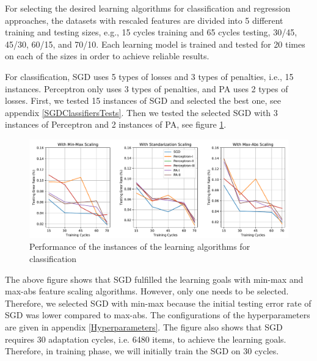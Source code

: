 \documentclass[a4paper,12pt]{article}
\begin{document}
For selecting the desired learning algorithms for classification and regression approaches, the datasets with rescaled features are divided into 5 different training and testing sizes, e.g., 15 cycles training and 65 cycles testing, 30/45, 45/30, 60/15, and 70/10. Each learning model is trained and tested for 20 times on each of the sizes in order to achieve reliable results. 

For classification, SGD uses 5 types of losses and 3 types of penalties, i.e., 15 instances. Perceptron only uses 3 types of penalties, and PA uses 2 types of losses. First, we tested 15 instances of SGD and selected the best one, see appendix \ref{SGDClassifiersTests}. Then we tested the selected SGD with 3 instances of Perceptron and 2 instances of PA, see figure \ref{Classifiers}.
\begin{figure}[H]
    \centering
    \includegraphics[keepaspectratio, width=\linewidth]{graphs/ClassificationModelSelection.pdf}
    \caption{Performance of the instances of the learning algorithms for classification}
    \label{Classifiers}
\end{figure}
The above figure shows that SGD fulfilled the learning goals with min-max and max-abs feature scaling algorithms. However, only one needs to be selected. Therefore, we selected SGD with min-max because the initial testing error rate of SGD was lower compared to max-abs. The configurations of the hyperparameters are given in appendix \ref{Hyperparameters}. The figure also shows that SGD requires 30 adaptation cycles, i.e. 6480 items, to achieve the learning goals. Therefore, in training phase, we will initially train the SGD on 30 cycles.
\end{document}
